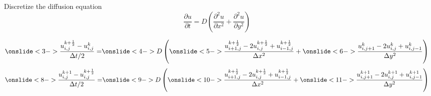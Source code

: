 \documentclass{beamer}
\begin{document}
\begin{frame}{Discretize the diffusion equation}
    \begin{equation*}
        \frac{\partial u}{\partial t} = D\left(\frac{\partial^2 u}{\partial x^2} + \frac{\partial^2 u}{\partial y^2}\right)
    \end{equation*}


    \begin{align*}
        \onslide<3->{\frac{u_{i,j}^{k+\frac{1}{2}} - u_{i,j}^k}{\Delta t/2} =} 
        \onslide<4->{D\left(
        \onslide<5->{    
        \frac{u_{i+1,j}^{k+\frac{1}{2}} - 2u_{i,j}^{k+\frac{1}{2}} + u_{i-1,j}^{k+\frac{1}{2}}}{\Delta x^2} }
            + 
        \onslide<6->{
            \frac{u_{i,j+1}^k - 2u_{i,j}^k + u_{i,j-1}^k}{\Delta y^2}
        }
            \right)} \nonumber \\
    \end{align*}
    \begin{align*}
        \onslide<8->{\frac{u_{i,j}^{k+1} - u_{i,j}^{k+\frac{1}{2}}}{\Delta t/2} =} 
        \onslide<9->{D\left(
        \onslide<10->{    
        \frac{u_{i+1,j}^{k+\frac{1}{2}} - 2u_{i,j}^{k+\frac{1}{2}} + u_{i-1,j}^{k+\frac{1}{2}}}{\Delta x^2} }
            + 
        \onslide<11->{
            \frac{u_{i,j+1}^{k+1} - 2u_{i,j}^{k+1} + u_{i,j-1}^{k+1}}{\Delta y^2}
        }
            \right)} \nonumber \\
    \end{align*}

\end{frame}
\end{document}
